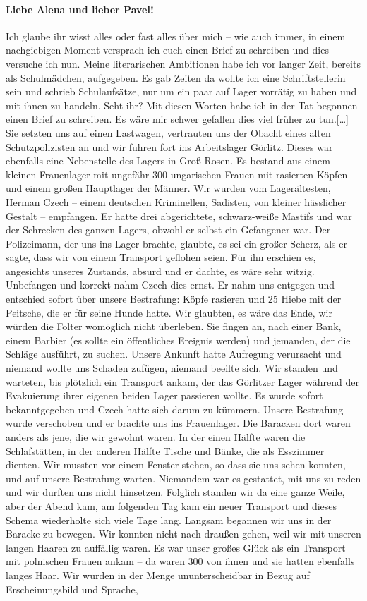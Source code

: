 \paragraph{Liebe Alena und lieber Pavel!}
Ich glaube ihr wisst alles oder fast alles über mich -- wie auch immer, in einem nachgiebigen Moment versprach ich euch einen Brief zu schreiben und dies versuche ich nun. Meine literarischen Ambitionen habe ich vor langer Zeit, bereits als Schulmädchen, aufgegeben. Es gab Zeiten da wollte ich eine Schriftstellerin sein und schrieb Schulaufsätze, nur um ein paar auf Lager vorrätig zu haben und mit ihnen zu handeln. Seht ihr? Mit diesen Worten habe ich in der Tat begonnen einen Brief zu schreiben. Es wäre mir schwer gefallen dies viel früher zu tun.[\dots]
Sie setzten uns auf einen Lastwagen, vertrauten uns der Obacht eines alten Schutzpolizisten an und wir fuhren fort ins Arbeitslager Görlitz. Dieses war ebenfalls eine Nebenstelle des Lagers in Groß-Rosen. Es bestand aus einem kleinen Frauenlager mit ungefähr 300 ungarischen Frauen mit rasierten Köpfen und einem großen Hauptlager der Männer. Wir wurden vom Lagerältesten, Herman Czech -- einem deutschen Kriminellen, Sadisten, von kleiner hässlicher Gestalt -- empfangen. Er hatte drei abgerichtete, schwarz-weiße Mastifs und war der Schrecken des ganzen Lagers, obwohl er selbst ein Gefangener war. Der Polizeimann, der uns ins Lager brachte, glaubte, es sei ein großer Scherz, als er sagte, dass wir von einem Transport geflohen seien. Für ihn erschien es, angesichts unseres Zustands, absurd und er dachte, es wäre sehr witzig. Unbefangen und korrekt nahm Czech dies ernst. Er nahm uns entgegen und entschied sofort über unsere Bestrafung: Köpfe rasieren und 25 Hiebe mit der Peitsche, die er für seine Hunde hatte. Wir glaubten, es wäre das Ende, wir würden die Folter womöglich nicht überleben. Sie fingen an, nach einer Bank, einem Barbier (es sollte ein öffentliches Ereignis werden) und jemanden, der die Schläge ausführt, zu suchen. Unsere Ankunft hatte Aufregung verursacht und niemand wollte uns Schaden zufügen, niemand beeilte sich. Wir standen und warteten, bis plötzlich ein Transport ankam, der das Görlitzer Lager während der Evakuierung ihrer eigenen beiden Lager passieren wollte. Es wurde sofort bekanntgegeben und Czech hatte sich darum zu kümmern. Unsere Bestrafung wurde verschoben und er brachte uns ins Frauenlager. Die Baracken dort waren anders als jene, die wir gewohnt waren. In der einen Hälfte waren die Schlafstätten, in der anderen Hälfte Tische und Bänke, die als Esszimmer dienten. Wir mussten vor einem Fenster stehen, so dass sie uns sehen konnten, und auf unsere Bestrafung warten. Niemandem war es gestattet, mit uns zu reden und wir durften uns nicht hinsetzen. Folglich standen wir da eine ganze Weile, aber der Abend kam, am folgenden Tag kam ein neuer Transport und dieses Schema wiederholte sich viele Tage lang. Langsam begannen wir uns in der Baracke zu bewegen. Wir konnten nicht nach draußen gehen, weil wir mit unseren langen Haaren zu auffällig waren. Es war unser großes Glück als ein Transport mit polnischen Frauen ankam -- da waren 300 von ihnen und sie hatten ebenfalls langes Haar. Wir wurden in der Menge ununterscheidbar in Bezug auf Erscheinungsbild und Sprache, 